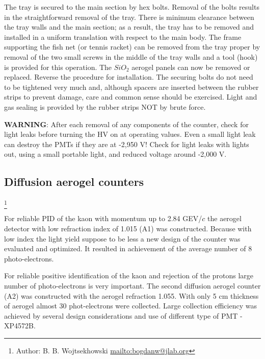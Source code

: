The tray is secured to the main section by hex bolts. Removal of the bolts 
results in the straightforward removal of the tray. There is minimum clearance 
between the tray walls and the main section; as a result, the tray has to 
be removed and installed in a uniform translation with respect to the main 
body. The frame supporting the fish net (or tennis racket) can be removed from 
the tray proper by removal of the two small screws in the middle of the tray 
walls and a tool (hook) is provided for this operation. The $SiO_2$ aerogel 
panels can now be removed or replaced. Reverse the procedure for installation.
The securing bolts do not need to be tightened very much and, although spacers 
are inserted between the rubber strips to prevent damage, care and common sense 
 should be exercised. Light and gas sealing is provided by the 
rubber strips NOT by brute force.

{\bf WARNING}: After each removal of any components of the counter, check for light 
leaks before turning the HV on at operating values. Even a small light 
leak can destroy the PMTs if they are at -2,950 V! Check for light leaks with 
lights out, using a small portable light, and reduced voltage around -2,000 V.

\subsection [Diffusion aerogel counters] {Diffusion aerogel counters}

\footnote{Author: B. B. Wojtsekhowski \url{mailto:bogdanw@jlab.org}}

For reliable PID of the kaon with momentum up to 2.84 GEV/$c$ 
the aerogel detector with low refraction index of 1.015 (A1) was constructed.
Because with low index the light yield suppose to be less a new design
of the counter was evaluated and optimized. It resulted in
achievement of the average number of 8 photo-electrons.

For reliable positive identification of the kaon and rejection of the protons 
large number of photo-electrons is very important. The second  diffusion
aerogel counter (A2) was constructed with the aerogel refraction 1.055. 
With only 5 cm thickness of aerogel almost 30 phot-electrons were collected. 
Large collection efficiency was achieved by several design considerations and
use of different type of PMT - XP4572B.

